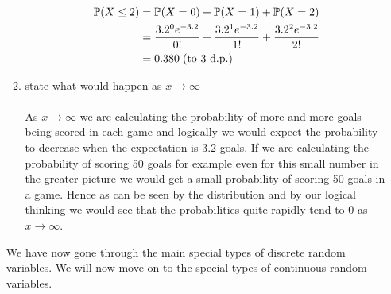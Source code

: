 \documentclass[,oneside]{article}
\begin{document}
\begin{enumerate}
\begin{enumerate}
\begin{align*}
\mathbb{P}(X \leq 2) &= \mathbb{P}(X = 0) + \mathbb{P}(X = 1) + \mathbb{P}(X = 2)\\
&= \frac{3.2^{0} e^{-3.2}}{0!} +  \frac{3.2^{1} e^{-3.2}}{1!} +  \frac{3.2^{2} e^{-3.2}}{2!} \\
&=0.380 \hspace{0.1cm} \text{(to 3 d.p.)}
\end{align*}
\item state what would happen as $x \rightarrow \infty$\\ \\
As $x \rightarrow \infty$ we are calculating the probability of more and more goals being scored in each game and logically we would expect the probability to decrease when the expectation is 3.2 goals. If we are calculating the probability of scoring 50 goals for example even for this small number in the greater picture we would get a small probability of scoring 50 goals in a game. Hence as can be seen by the distribution and by our logical thinking we would see that the probabilities quite rapidly tend to 0 as $x \rightarrow \infty$.\\
\end{enumerate}
We have now gone through the main special types of discrete random variables. We will now move on to the special types of continuous random variables.\\ \\

\end{enumerate}
\end{document}
